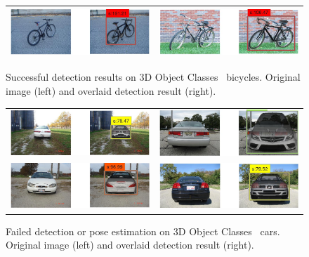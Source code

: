 \documentclass[10pt,twocolumn,letterpaper]{article}
\begin{document}
\begin{figure}[h]
\begin{tabular}{|c|c|}
  \includegraphics[width=0.40\linewidth]{supp/bicycle15.png} &
  \includegraphics[width=0.40\linewidth]{supp/bicycle10.png} \\
  \hline
  \end{tabular}
\caption{Successful detection results on 3D Object
  Classes~\cite{savarese07} bicycles. Original image (left) and
  overlaid detection result (right).}
  \label{fig:3dobject_bicycle_good}
\end{figure}

\begin{figure}[h]
\setlength\tabcolsep{1pt}
\centering
\begin{tabular}{|c|c|}
  \hline
  \includegraphics[width=0.40\linewidth]{supp/car13.png} &
  \includegraphics[width=0.40\linewidth]{supp/car30.png} \\ 
  \includegraphics[width=0.40\linewidth]{supp/car18.png} &
  \includegraphics[width=0.40\linewidth]{supp/car25.png} \\
  \hline
  \end{tabular}
\caption{Failed detection or pose estimation on 3D Object
  Classes~\cite{savarese07} cars. Original image (left) and overlaid
  detection result (right).}
  \label{fig:3dobject_car_bad}
\end{figure}
\end{document}
